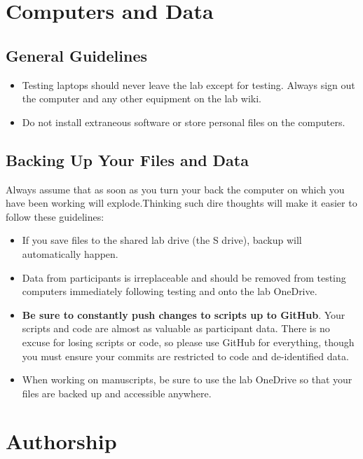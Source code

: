 \documentclass[letterpaper,11pt,oneside]{memoir}
\begin{document}
\section{Computers and Data}

\subsection{General Guidelines}

\begin{itemize}
\item Testing laptops should never leave the lab except for testing. Always sign out the computer and any other equipment on the lab wiki.
\item Do not install extraneous software or store personal files on the computers.
\end{itemize}

\subsection{Backing Up Your Files and Data}

Always assume that as soon as you turn your back the computer on which you have been working will explode.Thinking such dire thoughts will make it easier to follow these guidelines:

\begin{itemize}
\item If you save files to the shared lab drive (the S drive), backup will automatically happen. 
\item Data from participants is irreplaceable and should be removed from testing computers immediately following testing and onto the lab OneDrive.
\item \textbf{Be sure to constantly push changes to scripts up to GitHub}. Your scripts and code are almost as valuable as participant data. There is no excuse for losing scripts or code, so please use GitHub for everything, though you must ensure your commits are restricted to code and de-identified data.
\item When working on manuscripts, be sure to use the lab OneDrive so that your files are backed up and accessible anywhere.
\end{itemize}


\section{Authorship}
\label{sec:authorship}
\end{document}
